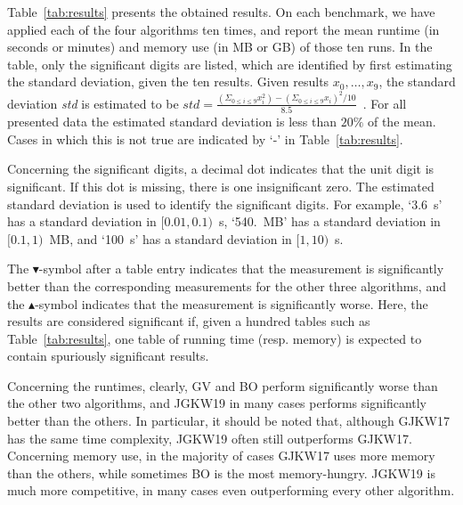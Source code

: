 \documentclass[a4paper,10pt]{article}
\theoremstyle{definition}
\theoremstyle{plain}
\newcommand{\remark}[1]{}
\newcommand{\dnj}[1]{\remark{\textcolor{red}{David: #1}}}
\newcommand{\jk}[1]{\remark{\textcolor{jkcolor}{JK: #1.}}}
\newcommand{\ob}{$\blacktriangle$} %
\newcommand{\og}{$\blacktriangledown$} %
\begin{document}

%

Table~\ref{tab:results} presents the obtained results. On each benchmark, we have applied each of the four algorithms ten times, and report the mean
runtime (in seconds or minutes) and memory use (in MB or GB) of those ten runs. In the table, only the significant digits are listed, which are identified by first estimating the standard deviation,
given the ten results. Given results $x_0, \ldots, x_9$, the standard deviation \textit{std} is estimated to be $\textit{std} = \frac{(\Sigma_{0 \leq i \leq 9} x_i^2) - (\Sigma_{0 \leq i \leq 9} x_i)^2/10}{8.5}$~\cite{B69}.
For all presented data the estimated standard deviation is less than $20\%$ of the mean. Cases in which this is not true are indicated by `-' in Table~\ref{tab:results}.

Concerning the significant digits, a decimal dot indicates that the unit digit is significant.
If this dot is missing, there is one insignificant zero.
The estimated standard deviation is used to identify the significant digits.
For example, `3.6~s' has a standard deviation in $[0.01,0.1)$~s, `540.~MB' has a standard deviation in $[0.1,1)$~MB, and `100~s' has a standard deviation in $[1,10)$~s.

The \og-symbol after a table entry indicates that the measurement is significantly better than the corresponding measurements for the other three algorithms, and the \ob-symbol indicates that the measurement is significantly worse.
Here, the results are considered significant if, given a hundred tables such as Table~\ref{tab:results}, one table of running time (resp. memory) is expected to contain spuriously significant results.

Concerning the runtimes, clearly, GV and BO perform significantly worse than the other two algorithms,
and JGKW19 in many cases performs significantly better than the others.
In particular, it should be noted that, although GJKW17 has the same time complexity, JGKW19 often still outperforms GJKW17.
Concerning memory use, in the majority of cases GJKW17 uses more memory than the others,
while sometimes BO is the most memory-hungry.
JGKW19 is much more competitive, in many cases even outperforming every other algorithm.
\end{document}

